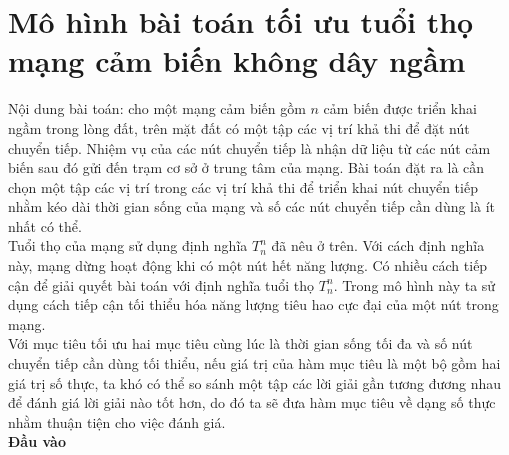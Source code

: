 \section{Mô hình bài toán tối ưu tuổi thọ mạng cảm biến không dây ngầm}
Nội dung bài toán: cho một mạng cảm biến gồm $n$ cảm biến được triển khai ngầm trong lòng đất, trên mặt đất có một tập các vị trí khả thi để đặt nút chuyển tiếp. Nhiệm vụ của các nút chuyển tiếp là nhận dữ liệu từ các nút cảm biến sau đó gửi đến trạm cơ sở ở trung tâm của mạng. Bài toán đặt ra là cần chọn một tập các vị trí trong các vị trí khả thi để triển khai nút chuyển tiếp nhằm kéo dài thời gian sống của mạng và số các nút chuyển tiếp cần dùng là ít nhất có thể.
\\Tuổi thọ của mạng sử dụng định nghĩa $T_n^n$ đã nêu ở trên. Với cách định nghĩa này, mạng dừng hoạt động khi có một nút hết năng lượng. Có nhiều cách tiếp cận để giải quyết bài toán với định nghĩa tuổi thọ $T_n^n$. Trong mô hình này ta sử dụng cách tiếp cận tối thiểu hóa năng lượng tiêu hao cực đại của một nút trong mạng.
\\Với mục tiêu tối ưu hai mục tiêu cùng lúc là thời gian sống tối đa và số nút chuyển tiếp cần dùng tối thiểu, nếu giá trị của hàm mục tiêu là một bộ gồm hai giá trị số thực, ta khó có thể so sánh một tập các lời giải gần tương đương nhau để đánh giá lời giải nào tốt hơn, do đó ta sẽ đưa hàm mục tiêu về dạng số thực nhằm thuận tiện cho việc đánh giá.
\\ \textbf{Đầu vào }
